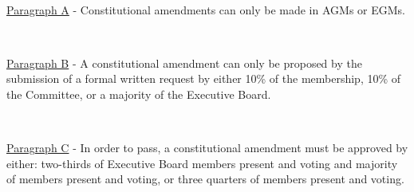 ~

\underline{Paragraph A} - Constitutional amendments can only be made in
AGMs or EGMs.

~

\underline{Paragraph B} - A constitutional amendment can only be
proposed by the submission of a formal written request by either 10\% of
the membership, 10\% of the Committee, or a majority of the Executive Board.

~

\underline{Paragraph C} - In order to pass, a constitutional amendment
must 
be approved by either: two-thirds of Executive Board members present 
and voting and majority of members present and voting, or three quarters of 
members present and voting. 

~
